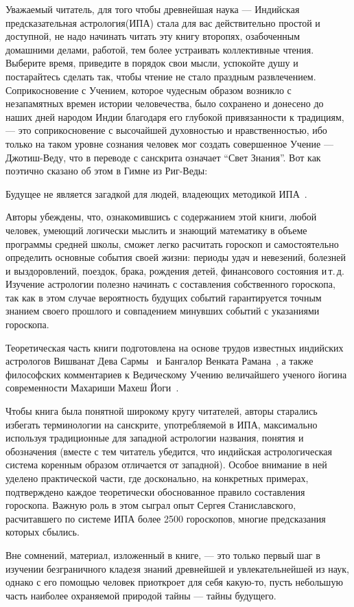 
Уважаемый читатель, для того чтобы древнейшая наука --- Индийская предсказательная астрология(ИПА) стала для вас действительно простой и доступной, не надо начинать читать эту книгу второпях, озабоченным домашними делами, работой, тем более устраивать коллективные чтения. Выберите время, приведите в порядок свои мысли, успокойте душу и постарайтесь сделать так, чтобы чтение не стало праздным развлечением. Соприкосновение с Учением, которое чудесным образом возникло с незапамятных времен истории человечества, было сохранено и донесено до наших дней народом Индии благодаря его глубокой привязанности к традициям, --- это соприкосновение с высочайшей духовностью и нравственностью, ибо только на таком уровне сознания человек мог создать совершенное Учение --- Джотиш-Веду, что в переводе с санскрита означает ``Свет Знания''. Вот как поэтично сказано об этом в Гимне из Риг-Веды:


Будущее не является загадкой для людей, владеющих методикой ИПА~\citep{ojha}.

Авторы убеждены, что, ознакомившись с содержанием этой книги, любой человек, умеющий логически мыслить и знающий математику в объеме программы средней школы, сможет легко расчитать гороскоп и самостоятельно определить основные события своей жизни: периоды удач и невезений, болезней и выздоровлений, поездок, брака, рождения детей, финансового состояния и\,т.\,д. Изучение астрологии полезно начинать с составления собственного гороскопа, так как в этом случае вероятность будущих событий гарантируется точным знанием своего прошлого и совпадением минувших событий с указаниями гороскопа.

Теоретическая часть книги подготовлена на основе трудов известных индийских астрологов Вишванат Дева Сармы~\citep{sarma} и Бангалор Венката Рамана~\citep{raman}, а также философских комментариев к Ведическому Учению величайшего ученого йогина современности Махариши Махеш Йоги~\citep{maharishi}.

Чтобы книга была понятной широкому кругу читателей, авторы старались избегать терминологии на санскрите, употребляемой в ИПА, максимально используя традиционные для западной астрологии названия, понятия и обозначения (вместе с тем читатель убедится, что индийская астрологическая система коренным образом отличается от западной). Особое внимание в ней уделено практической части, где досконально, на конкретных примерах, подтверждено каждое теоретически обоснованное правило составления гороскопа. Важную роль в этом сыграл опыт Сергея Станиславского, расчитавшего по системе ИПА более 2500 гороскопов, многие предсказания которых сбылись.

Вне сомнений, материал, изложенный в книге, --- это только первый шаг в изучении безграничного кладезя знаний древнейшей и увлекательнейшей из наук, однако с его помощью человек приоткроет для себя какую-то, пусть небольшую часть наиболее охраняемой природой тайны --- тайны будущего.
